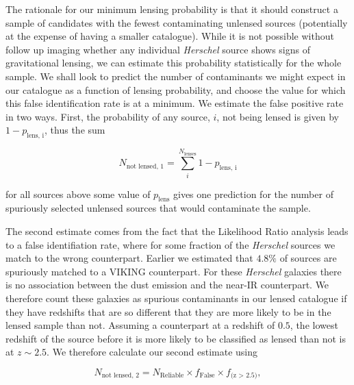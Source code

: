 The rationale for our minimum lensing probability is that it should construct a sample of candidates with the fewest contaminating unlensed sources (potentially at the expense of having a smaller catalogue). While it is not possible without follow up imaging whether any individual \textit{Herschel} source shows signs of gravitational lensing, we can estimate this probability statistically for the whole sample. We shall look to predict the number of contaminants we might expect in our catalogue as a function of lensing probability, and choose the value for which this false identification rate is at a minimum. We estimate the false positive rate in two ways. First, the probability of any source, $i$, not being lensed is given by $1 - p_{\textrm{lens, i}}$, thus the sum 

\begin{equation}
N_{\textrm{not lensed, 1}} = \sum_{i}^{N_{\textrm{lenses}}}{1 - p_{\textrm{lens, i}}}
\label{eq:unlensed_estimate_1}
\end{equation} 

\noindent for all sources above some value of $p_{\textrm{lens}}$ gives one prediction for the number of spuriously selected unlensed sources that would contaminate the sample.

The second estimate comes from the fact that the Likelihood Ratio analysis leads to a false identifiation rate, where for some fraction of the \textit{Herschel} sources we match to the wrong counterpart. Earlier we estimated that $4.8\%$ of sources are spuriously matched to a VIKING counterpart. For these \textit{Herschel} galaxies there is no association between the dust emission and the near-IR counterpart. We therefore count these galaxies as spurious contaminants in our lensed catalogue if they have redshifts that are so different that they are more likely to be in the lensed sample than not. Assuming a counterpart at a redshift of $0.5$, the lowest redshift of the source before it is more likely to be classified as lensed than not is at $z \sim 2.5$. We therefore calculate our second estimate using

\begin{equation}
N_{\textrm{not lensed, 2}} = N_{\textrm{Reliable}} \times f_{\textrm{False}} \times f_{\textrm{(z > 2.5)}},
\end{equation} 

